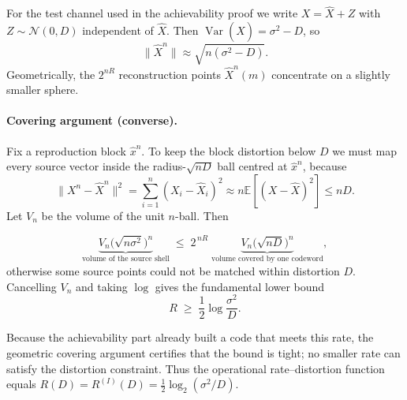 For the test channel used in the achievability proof we write
\(X=\widehat X+Z\) with \(Z\sim\mathcal N(0,D)\) independent of
\(\widehat X\).
Then \(\operatorname{Var}(\widehat X)=\sigma^{2}-D\), so
\[
\|\widehat X^{n}\|\approx\sqrt{n(\sigma^{2}-D)}.
\]
Geometrically, the \(2^{nR}\) reconstruction points
\(\widehat X^{n}(m)\)
concentrate on a slightly smaller sphere.

\paragraph{Covering argument (converse).}
Fix a reproduction block \(\widehat x^{n}\).
To keep the block distortion below \(D\) we must map every
source vector inside the radius-\(\sqrt{nD}\) ball centred at
\(\widehat x^{n}\), because
\[
\|X^{n}-\widehat X^{n}\|^{2}
      =\sum_{i=1}^{n}(X_{i}-\widehat X_{i})^{2}
      \approx n\mathbb E[(X-\widehat X)^{2}]
      \le nD.
\]
Let \(V_{n}\) be the volume of the unit \(n\)-ball.
Then

\[
\underbrace{V_{n}\bigl(\sqrt{n\sigma^{2}}\bigr)^{n}}
_{\text{volume of the source shell}}
\;\le\;
2^{\,nR}\;
\underbrace{V_{n}\bigl(\sqrt{nD}\bigr)^{n}}
_{\text{volume covered by one codeword}},
\]
otherwise some source points could not be matched within distortion
\(D\).
Cancelling \(V_{n}\) and taking \(\log\) gives the fundamental lower
bound
\[
R\;\ge\;\frac12\log\frac{\sigma^{2}}{D}.
\]

Because the achievability part already built a code that meets this
rate, the geometric covering argument certifies that the bound is
tight; no smaller rate can satisfy the distortion constraint.  Thus the
operational rate–distortion function equals
\(R(D)=R^{(I)}(D)=\tfrac12\log_{2}(\sigma^{2}/D)\).

